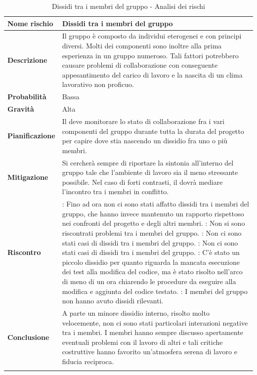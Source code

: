 \documentclass[12pt,a4paper]{article}
\begin{document}
\begin{center}
	\begin{longtable}[H]{p{} p{}}
		\toprule
		\textbf{Nome rischio} & \textbf{Dissidi tra i membri del gruppo} \\*
		\midrule
		\midrule
		\textbf{Descrizione} & Il gruppo è composto da individui eterogenei e con principi diversi. Molti dei componenti sono inoltre alla prima esperienza in un gruppo numeroso. Tali fattori potrebbero causare problemi di collaborazione con conseguente appesantimento del carico di lavoro e la nascita di un clima lavorativo non proficuo. \\*
		\midrule
		\textbf{Probabilità} & Bassa \\*
		\midrule
		\textbf{Gravità} & Alta \\*
		\midrule
		\textbf{Pianificazione} & Il \PM{} deve monitorare lo stato di collaborazione fra i vari componenti del gruppo durante tutta la durata del progetto per capire dove stia nascendo un dissidio fra uno o più membri. \\*
		\midrule
		\textbf{Mitigazione} & Si cercherà sempre di riportare la sintonia all’interno del gruppo tale che l’ambiente di lavoro sia il meno stressante possibile. Nel caso di forti contrasti, il \PM{} dovrà mediare l’incontro tra i membri in conflitto. \\*
		\midrule
		\textbf{Riscontro} & 
            \textbf{\FA{}}: Fino ad ora non ci sono stati affatto dissidi tra i membri del gruppo, 
                che hanno invece mantenuto un rapporto rispettoso nei confronti 
                del progetto e degli altri membri. \newline
            \textbf{\FAD{}}: Non si sono riscontrati problemi tra i membri del gruppo. \newline
            \textbf{\FPA{}}: Non ci sono stati casi di dissidi tra i membri del gruppo. \newline
            \textbf{\FPD{}}: Non ci sono stati casi di dissidi tra i membri del gruppo. \newline
            \textbf{\FC{}}: C'è stato un piccolo dissidio per quanto riguarda la mancata esecuzione dei test alla modifica del codice, ma è stato risolto nell'arco di meno di un ora chiarendo le procedure da eseguire alla modifica e aggiunta del codice testato. \newline
            \textbf{\FVV{}}: I membri del gruppo non hanno avuto dissidi rilevanti. \\*
        \midrule
		\textbf{Conclusione} & A parte un minore dissidio interno, risolto molto velocemente, non ci sono stati particolari interazioni negative tra i membri. I membri hanno sempre discusso apertamente eventuali problemi con il lavoro di altri e tali critiche costruttive hanno favorito un'atmosfera serena di lavoro e fiducia reciproca. \\*
		\bottomrule
		\caption{Dissidi tra i membri del gruppo - Analisi dei rischi}
	\end{longtable}
\end{center}
\end{document}
